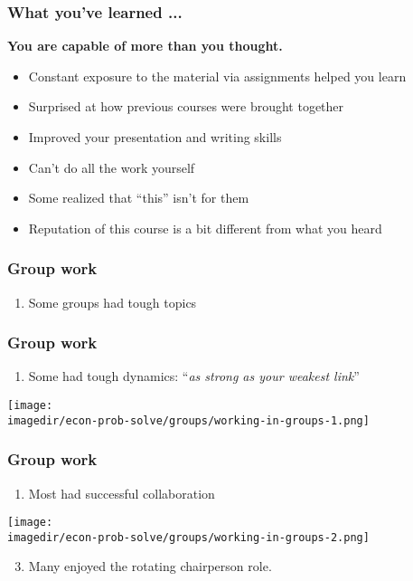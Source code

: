 \begin{frame}\frametitle{What you've learned ...}
	\begin{exampleblock}{}
		\begin{center}
			\textbf{\large You are capable of more than you thought.}
		\end{center}
	\end{exampleblock}
	\begin{itemize}
		\item	Constant exposure to the material via assignments helped you learn
		\item	Surprised at how previous courses were brought together
		\item	Improved your presentation and writing skills
		\item	Can't do all the work yourself
		\item	Some realized that ``this'' isn't for them
		\item	Reputation of this course is a bit different from what you heard
	\end{itemize}
\end{frame}

\begin{frame}\frametitle{Group work}
	\begin{enumerate}
		\item	Some groups had tough topics
	\end{enumerate}
	\vfill
\end{frame}

\begin{frame}\frametitle{Group work}
	\begin{enumerate}
		\item	Some had tough dynamics: ``\emph{as strong as your weakest link}''
	\end{enumerate}
	\begin{center}
		\texttt{[image: \\imagedir/econ-prob-solve/groups/working-in-groups-1.png]}
	\end{center}
\end{frame}

\begin{frame}\frametitle{Group work}
	\begin{enumerate}
		\item	Most had successful collaboration
	\end{enumerate}
	\begin{center}
		\texttt{[image: \\imagedir/econ-prob-solve/groups/working-in-groups-2.png]}
	\end{center}

	\begin{enumerate}
		\setcounter{enumi}{2}
		\item	Many enjoyed the rotating chairperson role.
	\end{enumerate}
\end{frame}

